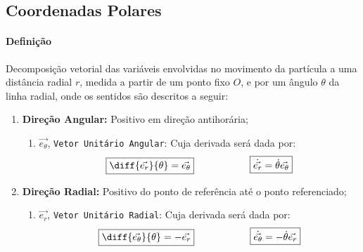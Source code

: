 \documentclass{article}
\begin{document}
        \subsection{Coordenadas Polares}
            \paragraph{Definição}Decomposição vetorial das variáveis envolvidas no movimento da partícula a uma distância radial $r$, medida a partir de um ponto fixo $O$, e por um ângulo $\theta$ da linha radial, onde os sentidos são descritos a seguir:
                \begin{enumerate}[noitemsep]
                    \item \textbf{Direção Angular:} Positivo em direção antihorária;
                        \begin{enumerate}
                            \item $\vec{e_{\theta}}$, \texttt{Vetor Unitário Angular}: Cuja derivada será dada por:
                            \[
                                \boxed{
                                    \diff{\vec{e_{r}}}{\theta} = \vec{e_{\theta}}
                                }
                                \hspace{20mm}
                                \boxed{
                                    \dot{\vec{e_{r}}} = \dot{\theta} \vec{e_{\theta}}
                                }
                            \]
                        \end{enumerate}
                    \item \textbf{Direção Radial:} Positivo do ponto de referência até o ponto referenciado;
                        \begin{enumerate}
                            \item $\vec{e_{r}}$, \texttt{Vetor Unitário Radial}: Cuja derivada será dada por:
                            \[
                                \boxed{
                                    \diff{\vec{e_{\theta}}}{\theta} = - \vec{e_{r}}
                                }
                                \hspace{20mm}
                                \boxed{
                                    \dot{\vec{e_{\theta}}} = -\dot{\theta} \vec{e_{r}}
                                }
                            \]
                        \end{enumerate}
                \end{enumerate}
\end{document}
